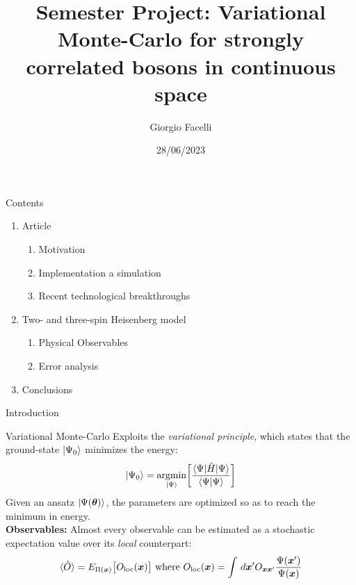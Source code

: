 \documentclass{beamer}
\title{Semester Project: Variational Monte-Carlo for strongly correlated bosons in continuous space}
\author{Giorgio Facelli}
\date{28/06/2023}
\DeclareMathOperator*{\argmin}{argmin}
\begin{document}
\begin{frame}[plain]
    \titlepage
\end{frame}

\begin{frame}{Contents}
  \begin{enumerate}
    \item \large Article
    \begin{enumerate}[I]
      \item Motivation
      \item Implementation a simulation
      \item Recent technological breakthroughs
    \end{enumerate} 
    \item \large Two- and three-spin Heisenberg model
    \begin{enumerate}[I]
      \item Physical Observables
      \item Error analysis
    \end{enumerate}
    \item \large Conclusions
  \end{enumerate}
\end{frame}

\begin{frame}{Introduction}

\end{frame}

\begin{frame}{Variational Monte-Carlo}
Exploits the \textit{variational principle}, which states that the ground-state $\ket{\Psi_0}$ minimizes 
the energy:
\begin{equation}
  \ket{\Psi_0} = \argmin_{\ket{\Psi}}\biggr[\dfrac{\braket{\Psi|\hat{H}|
  \Psi}}{\braket{\Psi|\Psi}}\biggr]
\end{equation}
Given an ansatz $\ket{\Psi(\bm{\theta})}$, the parameters are optimized so as to reach the minimum in 
energy.\\
\textbf{Observables:} Almost every observable can be estimated as a stochastic expectation value over its 
\textit{local} counterpart:
\begin{equation}
\braket{\hat{O}} = E_{\Pi(\bm{x})}\big[O_{\text{loc}}(\bm{x})\big]\text{   where   }
O_\text{loc}(\bm{x}) = \int \,d\bm{x}' O_{\bm{xx}'} \dfrac{\Psi(\bm{x}')}{\Psi(\bm{x})}
\end{equation}
\end{frame}
  
\end{document}
